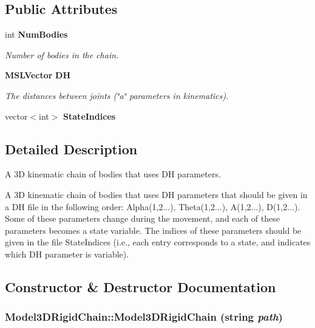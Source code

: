 \subsection*{Public Attributes}
\begin{CompactItemize}
\item 
int {\bf Num\-Bodies}
\begin{CompactList}\small\item\em Number of bodies in the chain.\item\end{CompactList}\item 
{\bf MSLVector} {\bf DH}
\begin{CompactList}\small\item\em The distances between joints (\char`\"{}a\char`\"{} parameters in kinematics).\item\end{CompactList}\item 
vector$<$int$>$ {\bf State\-Indices}
\end{CompactItemize}


\subsection{Detailed Description}
A 3D kinematic chain of bodies that uses DH parameters.

A 3D kinematic chain of bodies that uses DH parameters that should be given in a DH file in the following order: Alpha(1,2...), Theta(1,2...), A(1,2...), D(1,2...). Some of these parameters change during the movement, and each of these parameters becomes a state variable. The indices of these parameters should be given in the file State\-Indices (i.e., each entry corresponds to a state, and indicates which DH parameter is variable). 



\subsection{Constructor \& Destructor Documentation}
\subsubsection{\setlength{\rightskip}{0pt plus 5cm}Model3DRigid\-Chain::Model3DRigid\-Chain (string {\em path})}\label{class_Model3DRigidChain_a0}


